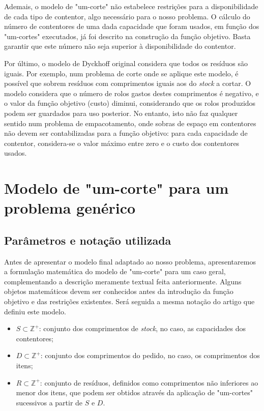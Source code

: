 \documentclass[12pt, a4paper, titlepage]{article}
\begin{document}
Ademais, o modelo de "um-corte"{} não estabelece restrições para a disponibilidade de cada tipo de
contentor, algo necessário para o nosso problema. O cálculo do número de contentores de uma dada
capacidade que foram usados, em função dos "um-cortes"{} executados, já foi descrito na construção
da função objetivo. Basta garantir que este número não seja superior à disponibilidade do contentor.

Por último, o modelo de Dyckhoff original considera que todos os resíduos são iguais. Por exemplo,
num problema de corte onde se aplique este modelo, é possível que sobrem resíduos com comprimentos
iguais aos do \emph{stock} a cortar. O modelo considera que o número de rolos gastos destes
comprimentos é negativo, e o valor da função objetivo (custo) diminui, considerando que os rolos
produzidos podem ser guardados para uso posterior. No entanto, isto não faz qualquer sentido num
problema de empacotamento, onde sobras de espaço em contentores não devem ser contabilizadas para a
função objetivo: para cada capacidade de contentor, considera-se o valor máximo entre zero e o custo
dos contentores usados.

\section{Modelo de "um-corte"{} para um problema genérico}

\subsection{Parâmetros e notação utilizada}

Antes de apresentar o modelo final adaptado ao nosso problema, apresentaremos a formulação
matemática do modelo de "um-corte"{} para um caso geral, complementando a descrição meramente
textual feita anteriormente. Alguns objetos matemáticos devem ser conhecidos antes da introdução da
função objetivo e das restrições existentes. Será seguida a mesma notação do artigo que definiu este
modelo. \cite{dyckhoff}

\begin{itemize}
    \item $S \subset \mathbb{\mathbb{Z}^+}$: conjunto dos comprimentos de \emph{stock}, no caso,
        as capacidades dos contentores;
    \item $D \subset \mathbb{\mathbb{Z}^+}$: conjunto dos comprimentos do pedido, no caso, os
        comprimentos dos
        itens;
    \item $R \subset \mathbb{\mathbb{Z}^+}$: conjunto de resíduos, definidos como comprimentos não
        inferiores ao menor dos itens, que podem ser obtidos através da aplicação de "um-cortes"{}
        sucessivos a partir de $S$ e $D$.
\end{itemize}
\end{document}
